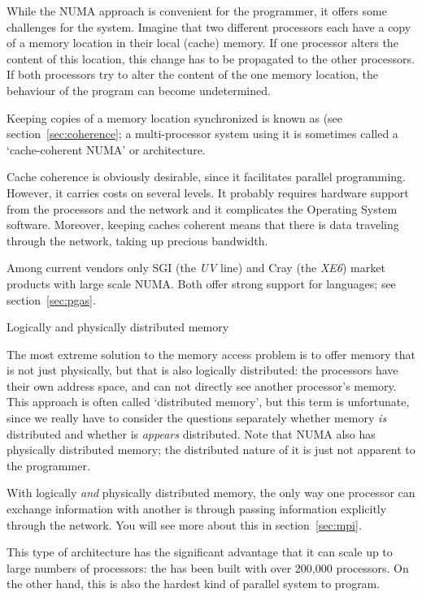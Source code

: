 While the \ac{NUMA} approach is convenient for the programmer, it offers some
challenges for the system. Imagine that two different processors each
have a copy of a memory location in their local (cache) memory. If one
processor alters the content of this location, this change has to be
propagated to the other processors. If both processors try to alter
the content of the one memory location, the behaviour of the program
can become undetermined.

Keeping copies of a memory location synchronized is known as
 (see section~\ref{sec:coherence};
a multi-processor system using it is sometimes called a
`cache-coherent NUMA' or  architecture.

Cache coherence is obviously desirable, since it facilitates parallel
programming. However, it carries costs on several levels. It probably
requires hardware support from the processors and the network and it
complicates the Operating System software. Moreover, keeping caches
coherent means that there is data traveling through the network,
taking up precious bandwidth.

Among current vendors only SGI (the \emph{UV} line) and
Cray (the \emph{XE6}) market products with large scale
NUMA. Both offer strong support for  languages; see
section~\ref{sec:pgas}.

 {Logically and physically distributed memory}

The most extreme solution to the memory access problem is to offer
memory that is not just physically, but that is also logically
distributed: the processors have their own address space, and can not
directly see another processor's memory. This approach is often called
`distributed memory', but this term is unfortunate, since we really
have to consider the questions separately whether memory \emph{is}
distributed and whether is \emph{appears} distributed.
Note that NUMA also has physically
distributed memory; the distributed nature of it is just not apparent
to the programmer.

With logically \emph{and} physically distributed memory, the only way
one processor can exchange information with another is through passing
information explicitly through the network. You will see more about
this in section~\ref{sec:mpi}.

This type of architecture has the significant advantage that it can
scale up to large numbers of processors: the
 has been built with over 200,000
processors. On the other hand, this is also the hardest kind of
parallel system to program.

